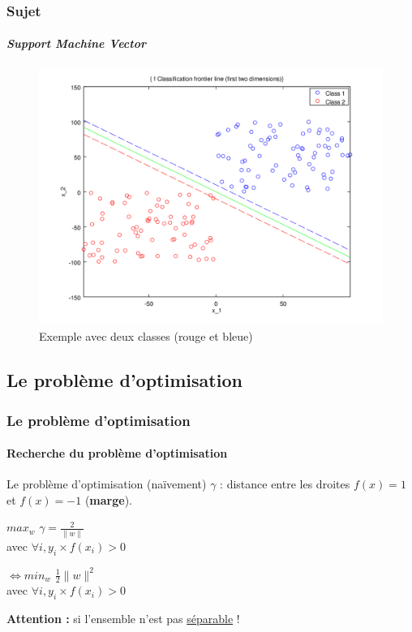 \documentclass{beamer}
\begin{document}
\begin{frame}
\frametitle{Sujet}
\framesubtitle{\emph{Support Machine Vector}}

         \begin{figure}
         \centering
         \caption{Exemple avec deux classes (rouge et bleue)}
         \includegraphics[scale=0.4]{images/voronoi.png}
         \end{figure}

\end{frame}

\subsection{Le problème d'optimisation}

\begin{frame}
\frametitle{Le problème d'optimisation}
\framesubtitle{Recherche du problème d'optimisation}

\begin{block}{Le problème d'optimisation (naïvement)}
$\gamma$ : distance entre les droites $f(x) = 1$ et $f(x) = -1$ (\textbf{marge}).

\pause

      \begin{center}
        $max_{w}$ $\gamma = \frac{2}{\|w\|}$\\
        avec $\forall i, y_i \times f(x_i) > 0$\\

\pause

       \bigskip
        $\Leftrightarrow min_{w}$ $\frac{1}{2} \|w\|^2$\\
        avec $\forall i, y_i \times f(x_i) > 0$\\
      \end{center}

\end{block}

\textbf{Attention :} si l'ensemble n'est pas \underline{séparable} !

\end{frame}
\end{document}
